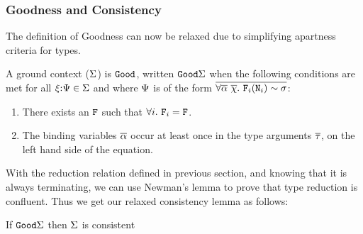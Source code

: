\documentclass[format=acmsmall,manuscript,review,screen,nonacm,margin=1in,11pt]{acmart}
\begin{document}
\subsubsection{Goodness and Consistency}\label{subsubsec:tf-constrained-goodness-consistency}
The definition of Goodness can now be relaxed due to simplifying apartness criteria for types.
\begin{property}
  A ground context ($\Sigma$) is $\texttt{Good}$, written $\texttt{Good}\Sigma$ when
  the following conditions are met for all $\xi{:}\Psi\in\Sigma$ and
  where $\Psi$ is of the form $\overline{\forall\overline{\alpha}~\overline{\chi}.~\texttt{F}_i(\texttt{N}_i)\mathrel{\sim}\sigma}$:
  \begin{enumerate}
  \item There exists an $\texttt{F}$ such that  $\forall i.~\texttt{F}_i = \texttt{F}$.
  \item The binding variables $\overline{\alpha}$ occur at least once in the type arguments $\overline{\tau}$,
    on the left hand side of the equation.
  \end{enumerate}
\end{property}
With the reduction relation defined in previous section, and knowing that it is always terminating,
we can use Newman's lemma\cite{newman_theories_1942} to prove that type reduction is confluent.
Thus we get our relaxed consistency lemma as follows:
\begin{lemma}[Consistency] If $\texttt{Good}\Sigma$ then $\Sigma$ is consistent \end{lemma}


\end{document}
